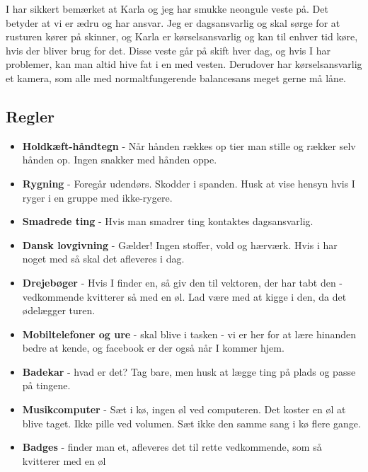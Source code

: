 I har sikkert bemærket at Karla og jeg har smukke neongule veste på. Det betyder at vi er ædru og har ansvar. Jeg er dagsansvarlig og skal sørge for at rusturen kører på skinner, og Karla er kørselsansvarlig og kan til enhver tid køre, hvis der bliver brug for det. Disse veste går på skift hver dag, og hvis I har problemer, kan man altid hive fat i en med vesten. Derudover har kørselsansvarlig et kamera, som alle med normaltfungerende balancesans meget gerne må låne.

\subsection*{Regler}
\begin{itemize}
  \item \textbf{Holdkæft-håndtegn} - Når hånden rækkes op tier man stille og rækker selv hånden op. Ingen snakker med hånden oppe.
  \item \textbf{Rygning} - Foregår udendørs. Skodder i spanden. Husk at vise hensyn hvis I ryger i en gruppe med ikke-rygere. 	
  \item \textbf{Smadrede ting} - Hvis man smadrer ting kontaktes dagsansvarlig.
  \item \textbf{Dansk lovgivning} - Gælder! Ingen stoffer, vold og hærværk. Hvis i har noget med så skal det afleveres i dag.
  \item \textbf{Drejebøger} - Hvis I finder en, så giv den til vektoren, der har tabt den - vedkommende kvitterer så med en øl. Lad være med at kigge i den, da det ødelægger turen.
  \item \textbf{Mobiltelefoner og ure} - skal blive i tasken - vi er her for at lære hinanden bedre at kende, og facebook er der også når I kommer hjem.
  \item \textbf{Badekar} - hvad er det? Tag bare, men husk at lægge ting på plads og passe på tingene. 
  \item \textbf{Musikcomputer} - Sæt i kø, ingen øl ved computeren. Det koster en øl at blive taget. Ikke pille ved volumen. Sæt ikke den samme sang i kø flere gange.
  \item \textbf{Badges} - finder man et, afleveres det til rette vedkommende, som så kvitterer med en øl
\end{itemize}

